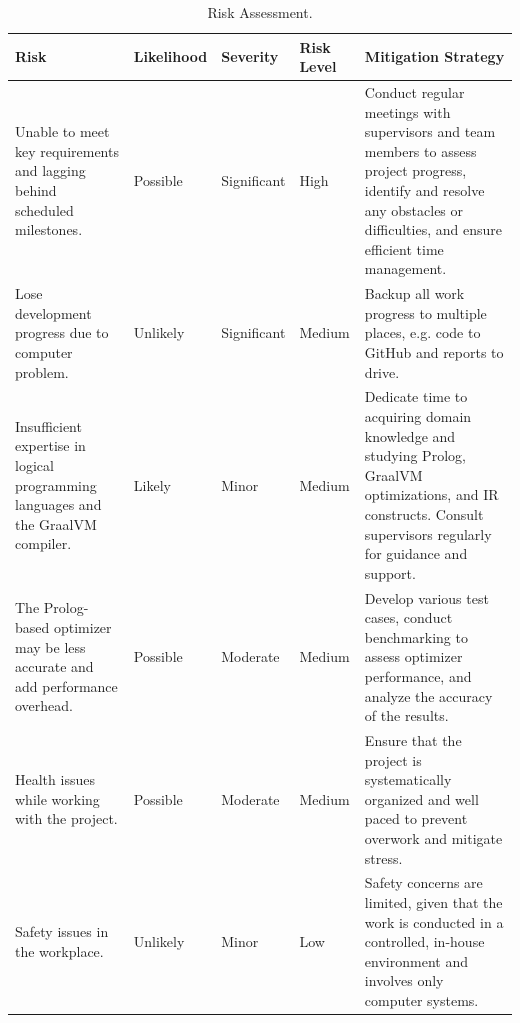\begin{table}[h]
    \begin{tabularx}{1\textwidth} { 
        | >{\raggedright\arraybackslash}p{8em}
        | >{\raggedright\arraybackslash}p{4.5em} 
        | >{\raggedright\arraybackslash}p{4.5em} 
        | >{\raggedright\arraybackslash}p{3.5em} 
        | >{\raggedright\arraybackslash}X 
        | 
        }   
        \hline
        \textbf{Risk} & 
        \textbf{Likelihood} & 
        \textbf{Severity} & 
        \textbf{Risk Level} &
        \textbf{Mitigation Strategy}
        \\ 
        \hline
        Unable to meet key requirements and lagging behind scheduled milestones.
        & Possible & Significant & High & 
        Conduct regular meetings with supervisors and team members to assess project progress, identify and resolve any obstacles or difficulties, and ensure efficient time management.
        \\ 
        \hline
        Lose development progress due to computer problem.
        & Unlikely & Significant & Medium & 
        Backup all work progress to multiple places, e.g. code to GitHub and reports to drive.
        \\ 
        \hline
        Insufficient expertise in logical programming languages and the GraalVM compiler.
        & Likely & Minor & Medium &
        Dedicate time to acquiring domain knowledge and studying Prolog, GraalVM optimizations, and IR constructs. Consult supervisors regularly for guidance and support.
        \\ 
        \hline
        The Prolog-based optimizer may be less accurate and add performance overhead.
        & Possible & Moderate & Medium &
        Develop various test cases, conduct benchmarking to assess optimizer performance, and analyze the accuracy of the results.
        \\ 
        \hline
        Health issues while working with the project.
        & Possible & Moderate & Medium &
        Ensure that the project is systematically organized and well paced to prevent overwork and mitigate stress.
        \\ 
        \hline
        Safety issues in the workplace.
        & Unlikely & Minor & Low &
        Safety concerns are limited, given that the work is conducted in a controlled, in-house environment and involves only computer systems.
        \\ 
        \hline
    \end{tabularx}
\caption{Risk Assessment.}
\end{table}


